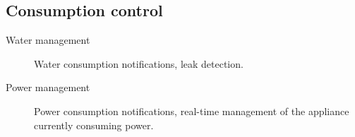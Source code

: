         \subsection{Consumption control}
            \begin{description}
                \item[Water management] Water consumption notifications, leak detection.
                \item[Power management] Power consumption notifications, real-time management of the appliance currently consuming power.
            \end{description}


